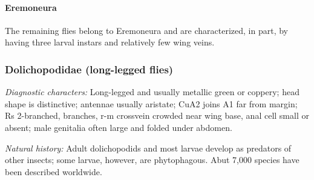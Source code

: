 \documentclass[letterpaper, 11pt]{article}
\begin{document}
\paragraph{Eremoneura} The remaining flies belong to Eremoneura and are characterized, in part, by having three larval instars and relatively few wing veins.

\subsubsection{Dolichopodidae (long-legged flies)}
\noindent{}\textit{Diagnostic characters:} Long-legged and usually metallic green or coppery; head shape is distinctive; antennae usually aristate; CuA2 joins A1 far from margin; Rs 2-branched, branches, r-m crossvein crowded near wing base, anal cell small or absent; male genitalia often large and folded under abdomen.

\noindent{}\textit{Natural history:} Adult dolichopodids and most larvae  develop as predators of other insects; some larvae, however, are phytophagous. Abut 7,000 species have been described worldwide.
\end{document}
